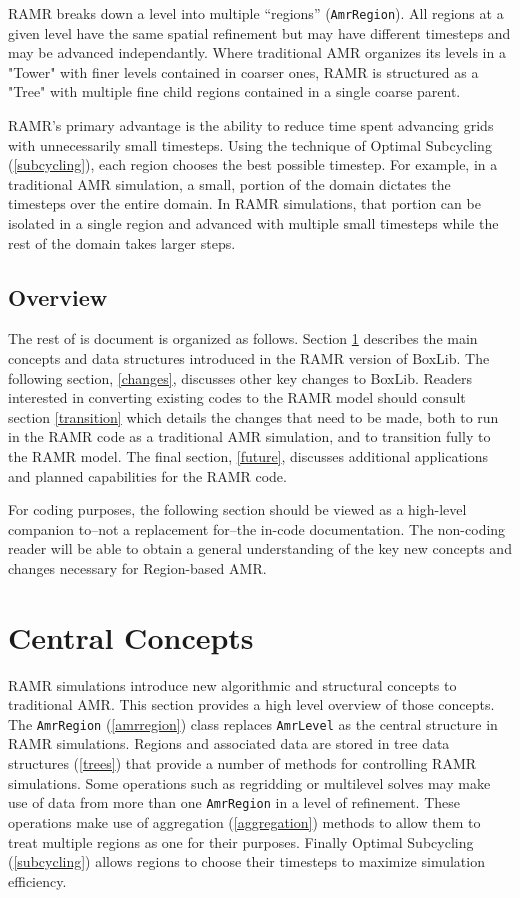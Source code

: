 \documentclass[11pt]{article}
\newcommand{\AR}{{\tt AmrRegion}}
\newcommand{\AL}{{\tt AmrLevel}}
\begin{document}
RAMR breaks down a level into multiple ``regions'' (\AR{}). All regions at a 
given level have the same spatial refinement but may have different 
timesteps and may be advanced independantly. Where traditional AMR 
organizes its levels in a "Tower" with finer levels contained in 
coarser ones, RAMR is structured as a "Tree" with multiple fine 
child regions contained in a single coarse parent.

RAMR's primary advantage is the ability to reduce time spent advancing 
grids with unnecessarily small timesteps. Using the technique of 
Optimal Subcycling (\ref{subcycling}), each region chooses the 
best possible timestep. For example, in a traditional AMR simulation, 
a small, portion of the domain dictates the timesteps over the entire 
domain. In RAMR simulations, that portion can be isolated in a single 
region and advanced with multiple small timesteps while the rest of 
the domain takes larger steps.

\subsection{Overview}

The rest of is document is organized as follows. Section \ref{concepts} 
describes the main concepts and data structures introduced 
in the RAMR version of BoxLib. The following section, \ref{changes}, 
discusses other key changes to BoxLib. Readers interested in 
converting existing codes to the RAMR model should consult 
section \ref{transition} which details the changes that need to be 
made, both to run in the RAMR code as a traditional AMR simulation, 
and to transition fully to the RAMR model. The final section, 
\ref{future}, discusses additional applications and planned 
capabilities for the RAMR code.

For coding purposes, the following section should be viewed as a 
high-level companion to--not a replacement for--the in-code 
documentation. The non-coding reader will be able to obtain a general 
understanding of the key new concepts and changes necessary for 
Region-based AMR.


\section{Central Concepts}
\label{concepts}

RAMR simulations introduce new algorithmic and structural concepts to 
traditional AMR. This section provides a high level overview of those 
concepts. The \AR{} (\ref{amrregion}) class replaces \AL{} as the 
central structure in RAMR simulations. Regions and associated data are 
stored in tree data structures (\ref{trees}) that provide a number of 
methods for controlling RAMR simulations. Some operations such as 
regridding or multilevel solves may make use of data from more than 
one \AR{} in a level of refinement. These operations make use of 
aggregation (\ref{aggregation}) methods to allow them to treat 
multiple regions as one for their purposes. Finally Optimal Subcycling 
(\ref{subcycling}) allows regions to choose their timesteps to 
maximize simulation efficiency.
\end{document}
